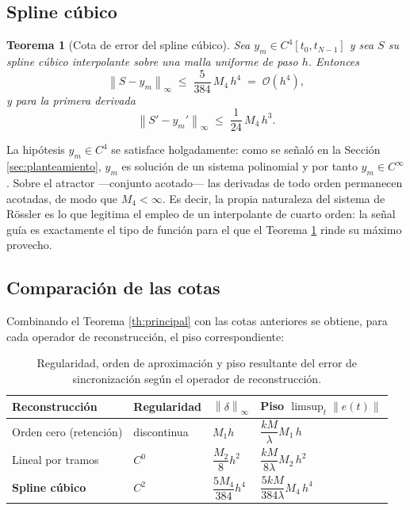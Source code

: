 \documentclass[12pt,a4paper]{article}
\newtheorem{teorema}{Teorema}[section]
\newcommand{\dnorm}[1]{\left\lVert #1 \right\rVert}
\newcommand{\infnorm}[1]{\dnorm{#1}_{\infty}}
\begin{document}
\subsection{Spline cúbico}

\begin{teorema}[Cota de error del spline cúbico]
\label{th:spline}
Sea $y_m \in C^{4}[t_0,t_{N-1}]$ y sea $S$ su spline cúbico interpolante sobre una
malla uniforme de paso $h$. Entonces
\begin{equation}
\label{eq:cota-spline}
  \infnorm{S - y_m} \;\le\; \frac{5}{384}\,M_4\,h^{4} \;=\; \mathcal{O}(h^{4}),
\end{equation}
y para la primera derivada
\begin{equation}
\label{eq:cota-spline-derivada}
  \infnorm{S' - y_m'} \;\le\; \frac{1}{24}\,M_4\,h^{3}.
\end{equation}
\end{teorema}

La hipótesis $y_m\in C^4$ se satisface holgadamente: como se señaló en la
Sección \ref{sec:planteamiento}, $y_m$ es solución de un sistema polinomial y por
tanto $y_m\in C^{\infty}$. Sobre el atractor —conjunto acotado— las derivadas de
todo orden permanecen acotadas, de modo que $M_4<\infty$. Es decir, la propia
naturaleza del sistema de Rössler es lo que legitima el empleo de un interpolante
de cuarto orden: la señal guía es exactamente el tipo de función para el que el
Teorema \ref{th:spline} rinde su máximo provecho.

\subsection{Comparación de las cotas}

Combinando el Teorema \ref{th:principal} con las cotas anteriores se obtiene, para
cada operador de reconstrucción, el piso correspondiente:

\begin{table}[H]
\centering
\caption{Regularidad, orden de aproximación y piso resultante del error de
sincronización según el operador de reconstrucción.}
\label{tab:ordenes}
\begin{tabular}{@{}llll@{}}
\toprule
\textbf{Reconstrucción} & \textbf{Regularidad} & $\infnorm{\delta}$ &
\textbf{Piso } $\displaystyle\limsup_t \dnorm{e(t)}$ \\
\midrule
Orden cero (retención) & discontinua & $M_1 h$              & $\dfrac{kM}{\lambda}M_1\,h$ \\[0.9em]
Lineal por tramos      & $C^{0}$     & $\dfrac{M_2}{8}h^{2}$ & $\dfrac{kM}{8\lambda}M_2\,h^{2}$ \\[0.9em]
\textbf{Spline cúbico} & $C^{2}$     & $\dfrac{5M_4}{384}h^{4}$ & $\dfrac{5kM}{384\lambda}M_4\,h^{4}$ \\
\bottomrule
\end{tabular}
\end{table}
\end{document}
